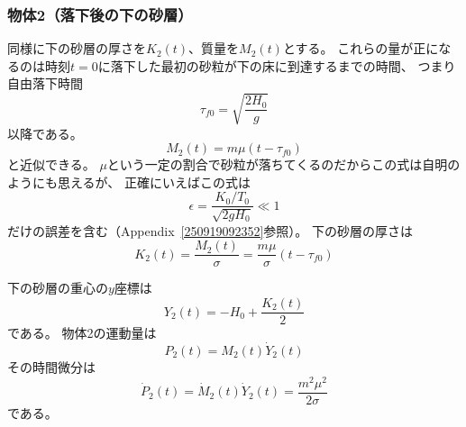 \documentclass[dvipdfmx]{article}
\begin{document}
\subsubsection{物体2（落下後の下の砂層）}
同様に下の砂層の厚さを$K_2(t)$、質量を$M_2(t)$とする。
これらの量が正になるのは時刻$t=0$に落下した最初の砂粒が下の床に到達するまでの時間、
つまり自由落下時間
\begin{equation} \label{250703153227} 
   \tau_{f0} = \sqrt{\frac{2H_0}{g}}
\end{equation}
以降である。
\begin{equation} \label{250919091147} 
   M_2(t) = m\mu (t-\tau_{f0})
\end{equation}
と近似できる。
$\mu$という一定の割合で砂粒が落ちてくるのだからこの式は自明のようにも思えるが、
正確にいえばこの式は
\begin{equation} \label{250919092251} 
   \epsilon = \frac{K_0/T_0}{\sqrt{2gH_0}}  \ll 1
\end{equation}
だけの誤差を含む（Appendix~\ref{250919092352}参照）。
下の砂層の厚さは
\begin{equation} \label{250919104425} 
   K_2(t) = \frac{M_2(t)}{\sigma} = \frac{m\mu}{\sigma}(t-\tau_{f0})
\end{equation}

下の砂層の重心の$y$座標は
\begin{equation} \label{250703154424} 
   Y_2(t) = -H_0 + \frac{K_2(t)}{2} 
\end{equation}
である。
物体2の運動量は
\begin{equation} \label{250917103019} 
   P_2(t) = M_2(t)\dot{Y}_2(t)  
\end{equation}
その時間微分は
\begin{equation} \label{250919104243} 
   \dot{P}_2(t) = \dot{M}_2(t)\dot{Y}_2(t) = \frac{m^2\mu^2}{2\sigma}
\end{equation}
である。


\end{document}
